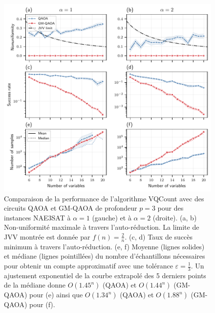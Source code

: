 \begin{figure}[H]
    \centering
    \includegraphics[width=1\textwidth]{figures/nae3sat-number-of-samples.pdf}
    \caption[Biais d'échantillonnage de \#NAE3SAT]{Comparaison de la performance de l'algorithme VQCount avec des circuits QAOA et GM-QAOA de profondeur $p=3$ pour des instances NAE3SAT à $\alpha=1$ (gauche) et à $\alpha=2$ (droite). (a, b) Non-uniformité maximale à travers l'auto-réduction. La limite de JVV montrée est donnée par $f(n) = \frac{2}{n}$. (c, d) Taux de succès minimum à travers l'auto-réduction. (e, f) Moyenne (lignes solides) et médiane (lignes pointillées) du nombre d'échantillons nécessaires pour obtenir un compte approximatif avec une tolérance $\varepsilon=\frac{1}{3}$. Un ajustement exponentiel de la courbe extrapolé des 5 derniers points de la médiane donne $O(1.45^n)$ (QAOA) et $O(1.44^n)$ (GM-QAOA) pour (e) ainsi que $O(1.34^n)$ (QAOA) et $O(1.88^n)$ (GM-QAOA) pour (f).}
    \label{fig:nae3sat-number-of-samples}
\end{figure}


